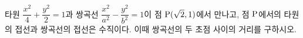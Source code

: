 타원 $\dfrac{x^2}{4}+\dfrac{y^2}{2}=1$과 쌍곡선 $\dfrac{x^2}{a^2}-\dfrac{y^2}{b^2}=1$이 점 $\mathrm{P}(\sqrt{2}{,}\mkern3mu\mathopen{}1)$에서 만나고, 점 $\mathrm{P}$에서의 타원의 접선과 쌍곡선의 접선은 수직이다. 이때 쌍곡선의 두 초점 사이의 거리를 구하시오. 
